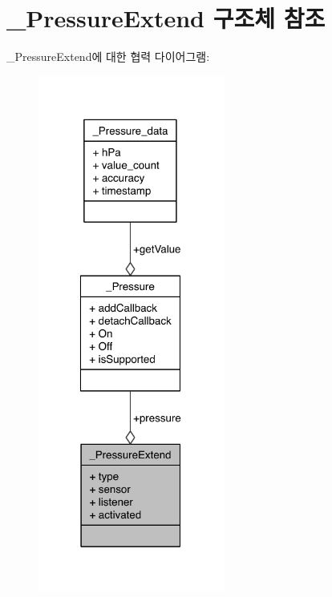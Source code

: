 \hypertarget{struct__PressureExtend}{\section{\-\_\-\-Pressure\-Extend 구조체 참조}
\label{struct__PressureExtend}
}


\-\_\-\-Pressure\-Extend에 대한 협력 다이어그램\-:\nopagebreak
\begin{figure}[H]
\begin{center}
\leavevmode
\includegraphics[width=174pt]{d8/d7e/struct__PressureExtend__coll__graph}
\end{center}
\end{figure}
